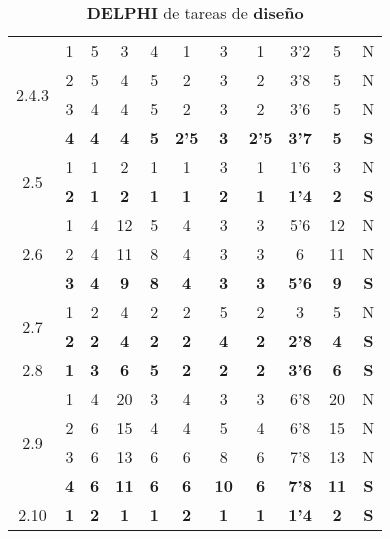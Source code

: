 \documentclass[11pt,a4paper,spanish,twoside]{report}
\begin{document}
\begin{table}[!h]
\begin{tabular}{|c|c||c|c|c|c|c||c|c|c||c|}
    \multirow{4}{*}{2.4.3}
    & 1 & 5 & 3 & 4 & 1 & 3 & 1 & 3'2 & 5 & N \\
    & 2 & 5 & 4 & 5 & 2 & 3 & 2 & 3'8 & 5 & N \\
    & 3 & 4 & 4 & 5 & 2 & 3 & 2 & 3'6 & 5 & N \\
    & \textbf{4} & \textbf{4} & \textbf{4} & \textbf{5} & \textbf{2'5} &
    \textbf{3} & \textbf{2'5} & \textbf{3'7} & \textbf{5} & \textbf{S} \\ 
    \hline

    \multirow{2}{*}{2.5}& 1 & 1 & 2 & 1 & 1 & 3 & 1 & 1'6 & 3 & N \\
    & \textbf{2} & \textbf{1} & \textbf{2} & \textbf{1} & \textbf{1} &
    \textbf{2} & \textbf{1} & \textbf{1'4} & \textbf{2} & \textbf{S} \\ 
    \hline

    \multirow{3}{*}{2.6}
    & 1 & 4 & 12 & 5 & 4 & 3 & 3 & 5'6 & 12 & N \\
    & 2 & 4 & 11 & 8 & 4 & 3 & 3 & 6 & 11 & N \\
    & \textbf{3} & \textbf{4} & \textbf{9} & \textbf{8} & \textbf{4} &
    \textbf{3} & \textbf{3} & \textbf{5'6} & \textbf{9} & \textbf{S} \\
    \hline

    \multirow{2}{*}{2.7}& 1 & 2 & 4 & 2 & 2 & 5 & 2 & 3 & 5 & N \\
    & \textbf{2} & \textbf{2} & \textbf{4} & \textbf{2} & \textbf{2} &
    \textbf{4} & \textbf{2} & \textbf{2'8} & \textbf{4} & \textbf{S} \\
    \hline

    2.8 & \textbf{1} & \textbf{3} & \textbf{6} & \textbf{5} &
    \textbf{2} & \textbf{2} & \textbf{2} & \textbf{3'6} & \textbf{6} &
    \textbf{S} \\ 
    \hline

    \multirow{4}{*}{2.9}
    & 1 & 4 & 20 & 3 & 4 & 3 & 3 & 6'8 & 20 & N \\
    & 2 & 6 & 15 & 4 & 4 & 5 & 4 & 6'8 & 15 & N \\
    & 3 & 6 & 13 & 6 & 6 & 8 & 6 & 7'8 & 13 & N \\
    & \textbf{4} & \textbf{6} & \textbf{11} & \textbf{6} & \textbf{6} &
    \textbf{10} & \textbf{6} & \textbf{7'8} & \textbf{11} & \textbf{S} \\ 
    \hline

    2.10 & \textbf{1} & \textbf{2} & \textbf{1} & \textbf{1} &
    \textbf{2} & \textbf{1} & \textbf{1} & \textbf{1'4} & \textbf{2} &
    \textbf{S} \\
    \hline
  \end{tabular}
  \caption{\textbf{DELPHI} de tareas de \textbf{diseño}}
  \label{Tab:DELPHIdis}
\end{table}
\end{document}
